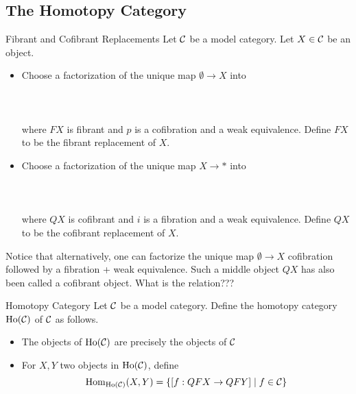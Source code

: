 \documentclass[a4paper]{article}
\begin{document}
\subsection{The Homotopy Category}
\begin{defn}{Fibrant and Cofibrant Replacements}{} Let $\mathcal{C}$ be a model category. Let $X\in\mathcal{C}$ be an object. 
\begin{itemize}
\item Choose a factorization of the unique map $\emptyset\to X$ into \\~\\
\\~\\ 
where $FX$ is fibrant and $p$ is a cofibration and a weak equivalence. Define $FX$ to be the fibrant replacement of $X$. 
\item Choose a factorization of the unique map $X\to\ast$ into \\~\\
\\~\\ 
where $QX$ is cofibrant and $i$ is a fibration and a weak equivalence. Define $QX$ to be the cofibrant replacement of $X$. 
\end{itemize}
\end{defn}

Notice that alternatively, one can factorize the unique map $\emptyset\to X$ cofibration followed by a fibration + weak equivalence. Such a middle object $QX$ has also been called a cofibrant object. What is the relation???

\begin{defn}{Homotopy Category}{} Let $\mathcal{C}$ be a model category. Define the homotopy category $\text{Ho}(\mathcal{C})$ of $\mathcal{C}$ as follows. 
\begin{itemize}
\item The objects of $\text{Ho}(\mathcal{C})$ are precisely the objects of $\mathcal{C}$
\item For $X,Y$ two objects in $\text{Ho}(\mathcal{C})$, define $$\operatorname{Hom}_{\text{Ho}(\mathcal{C})}(X,Y)=\{[f:QFX\to QFY]\;|\;f\in\mathcal{C}\}$$
\end{itemize}
\end{defn}
\end{document}
